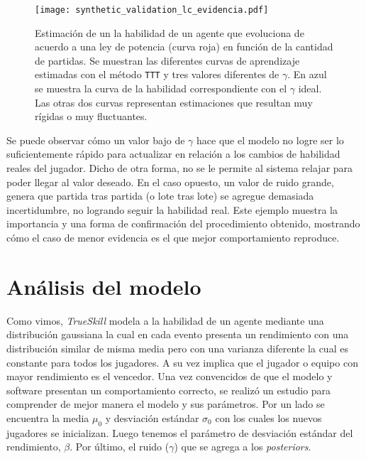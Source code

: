 \documentclass[11pt,twoside,spanish]{report} %
\begin{document}
\begin{figure}[H]
	\centering
	\texttt{[image: synthetic\_validation\_lc\_evidencia.pdf]}
	\caption{Estimaci\'on de un la habilidad de un agente que evoluciona de acuerdo a una ley de potencia (curva roja) en funci\'on de la cantidad de partidas.
	Se muestran las diferentes curvas de aprendizaje estimadas con el m\'etodo \texttt{TTT} y tres valores diferentes de $\gamma$.
    En azul se muestra la curva de la habilidad correspondiente con el $\gamma$ ideal.
	Las otras dos curvas representan estimaciones que resultan muy r\'igidas o muy fluctuantes.
	}
	\label{fig:lcVSevi}
\end{figure}

Se puede observar c\'omo un valor bajo de $\gamma$ hace que el modelo no logre ser lo suficientemente r\'apido para actualizar en relaci\'on a los cambios de habilidad reales del jugador.
Dicho de otra forma, no se le permite al sistema relajar para poder llegar al valor deseado.
En el caso opuesto, un valor de ruido grande, genera que partida tras partida (o lote tras lote) se agregue demasiada incertidumbre, no logrando seguir la habilidad real.
Este ejemplo muestra la importancia y una forma de confirmaci\'on del procedimiento obtenido, mostrando c\'omo el caso de menor evidencia es el que mejor comportamiento reproduce.





\section{An\'alisis del modelo}\label{sec:analisisModelo} 

Como vimos, \textit{TrueSkill} modela a la habilidad de un agente mediante una distribuci\'on gaussiana la cual en cada evento presenta un rendimiento con una distribuci\'on similar de misma media pero con una varianza diferente la cual es constante para todos los jugadores.
A su vez implica que el jugador o equipo con mayor rendimiento es el vencedor.
Una vez convencidos de que el modelo y software presentan un comportamiento correcto, se realiz\'o un estudio para comprender de mejor manera el modelo y sus par\'ametros.
Por un lado se encuentra la media $\mu_0$ y desviaci\'on est\'andar $\sigma_0$ con los cuales los nuevos jugadores se inicializan.
Luego tenemos el par\'ametro de desviaci\'on est\'andar del rendimiento, $\beta$.
Por \'ultimo, el ruido ($\gamma$) que se agrega a los \textit{posteriors}.
\end{document}
